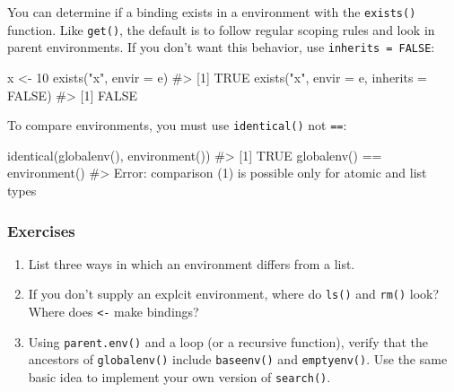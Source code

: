 \documentclass[oneside]{book}
\newenvironment{Shaded}{}{}
\newcommand{\KeywordTok} [1]{\textcolor[rgb]{0.00,0.44,0.13}{{#1}}}
\newcommand{\DataTypeTok}[1]{\textcolor[rgb]{0.56,0.13,0.00}{{#1}}}
\newcommand{\DecValTok}  [1]{\textcolor[rgb]{0.25,0.63,0.44}{{#1}}}
\newcommand{\StringTok}  [1]{\textcolor[rgb]{0.25,0.44,0.63}{{#1}}}
\newcommand{\CommentTok} [1]{\textcolor[rgb]{0.38,0.63,0.69}{{#1}}}
\newcommand{\OtherTok}   [1]{\textcolor[rgb]{0.00,0.44,0.13}{{#1}}}
\newcommand{\NormalTok}  [1]{{#1}}
\begin{document}
You can determine if a binding exists in a environment with the
\texttt{exists()} function. Like \texttt{get()}, the default is to
follow regular scoping rules and look in parent environments. If you
don't want this behavior, use \texttt{inherits = FALSE}:

\begin{Shaded}
\begin{Highlighting}[]
\NormalTok{x <-}\StringTok{ }\DecValTok{10}
\KeywordTok{exists}\NormalTok{(}\StringTok{"x"}\NormalTok{, }\DataTypeTok{envir =} \NormalTok{e)}
\CommentTok{#> [1] TRUE}
\KeywordTok{exists}\NormalTok{(}\StringTok{"x"}\NormalTok{, }\DataTypeTok{envir =} \NormalTok{e, }\DataTypeTok{inherits =} \OtherTok{FALSE}\NormalTok{)}
\CommentTok{#> [1] FALSE}
\end{Highlighting}
\end{Shaded}

To compare environments, you must use \texttt{identical()} not
\texttt{==}:

\begin{Shaded}
\begin{Highlighting}[]
\KeywordTok{identical}\NormalTok{(}\KeywordTok{globalenv}\NormalTok{(), }\KeywordTok{environment}\NormalTok{())}
\CommentTok{#> [1] TRUE}
\KeywordTok{globalenv}\NormalTok{() ==}\StringTok{ }\KeywordTok{environment}\NormalTok{()}
\CommentTok{#> Error: comparison (1) is possible only for atomic and list types}
\end{Highlighting}
\end{Shaded}

\subsubsection{Exercises}\label{exercises}

\begin{enumerate}
\def\labelenumi{\arabic{enumi}.}
\item
  List three ways in which an environment differs from a list.
\item
  If you don't supply an explcit environment, where do \texttt{ls()} and
  \texttt{rm()} look? Where does \texttt{\textless{}-} make bindings?
\item
  Using \texttt{parent.env()} and a loop (or a recursive function),
  verify that the ancestors of \texttt{globalenv()} include
  \texttt{baseenv()} and \texttt{emptyenv()}. Use the same basic idea to
  implement your own version of \texttt{search()}.
\end{enumerate}
\end{document}
